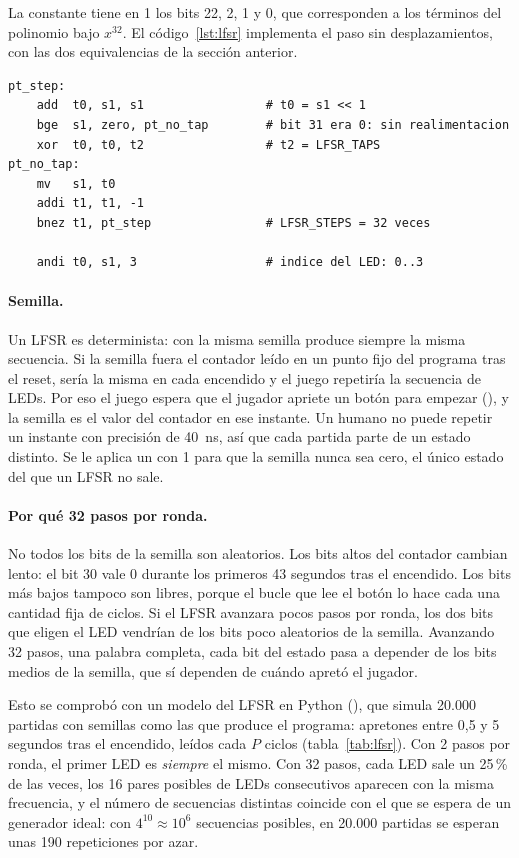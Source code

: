 La constante  tiene en 1 los bits 22, 2, 1 y 0, que corresponden a
los términos del polinomio bajo $x^{32}$. El código~\ref{lst:lfsr} implementa el paso
sin desplazamientos, con las dos equivalencias de la sección anterior.

\begin{lstlisting}[language=rvasm, caption={Paso del LFSR y elección del LED en \code{pick\_target}.}, label={lst:lfsr}]
pt_step:
    add  t0, s1, s1                 # t0 = s1 << 1
    bge  s1, zero, pt_no_tap        # bit 31 era 0: sin realimentacion
    xor  t0, t0, t2                 # t2 = LFSR_TAPS
pt_no_tap:
    mv   s1, t0
    addi t1, t1, -1
    bnez t1, pt_step                # LFSR_STEPS = 32 veces

    andi t0, s1, 3                  # indice del LED: 0..3
\end{lstlisting}

\paragraph{Semilla.} Un LFSR es determinista: con la misma semilla produce siempre la
misma secuencia. Si la semilla fuera el contador leído en un punto fijo del programa
tras el reset, sería la misma en cada encendido y el juego repetiría la secuencia de
LEDs. Por eso el juego espera que el jugador apriete un botón para empezar
(), y la semilla es el valor del contador en ese instante. Un humano
no puede repetir un instante con precisión de 40~ns, así que cada partida parte de
un estado distinto. Se le aplica un  con 1 para que la semilla nunca sea
cero, el único estado del que un LFSR no sale.

\paragraph{Por qué 32 pasos por ronda.} No todos los bits de la semilla son
aleatorios. Los bits altos del contador cambian lento: el bit 30 vale 0 durante los
primeros 43 segundos tras el encendido. Los bits más bajos tampoco son libres, porque
el bucle que lee el botón lo hace cada una cantidad fija de ciclos. Si el LFSR avanzara
pocos pasos por ronda, los dos bits que eligen el LED vendrían de los bits poco
aleatorios de la semilla. Avanzando 32 pasos, una palabra completa, cada bit del
estado pasa a depender de los bits medios de la semilla, que sí dependen de cuándo
apretó el jugador.

Esto se comprobó con un modelo del LFSR en Python (), que
simula 20.000 partidas con semillas como las que produce el programa: apretones entre
0,5 y 5 segundos tras el encendido, leídos cada $P$ ciclos
(tabla~\ref{tab:lfsr}). Con 2 pasos por ronda, el primer LED es \emph{siempre} el
mismo. Con 32 pasos, cada LED sale un 25\,\% de las veces, los 16 pares posibles de LEDs
consecutivos aparecen con la misma frecuencia, y el número de secuencias distintas
coincide con el que se espera de un generador ideal: con $4^{10} \approx 10^6$
secuencias posibles, en 20.000 partidas se esperan unas 190 repeticiones por azar.

